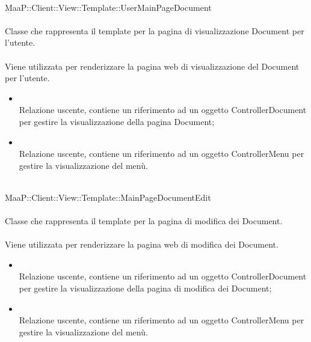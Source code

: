 	\\
	MaaP::Client::View::Template::UserMainPageDocument\\
	\\
	Classe che rappresenta il template per la pagina di visualizzazione Document per l'utente.\\
	\\
	Viene utilizzata per renderizzare la pagina web di visualizzazione del Document per l'utente.\\
	\begin{itemize}
	\item{}\\
	Relazione uscente, contiene un riferimento ad un oggetto ControllerDocument per gestire la visualizzazione della pagina Document;
	\item{}\\
	Relazione uscente, contiene un riferimento ad un oggetto ControllerMenu per gestire la visualizzazione del menù.
	\end{itemize}
	
	\\
	MaaP::Client::View::Template::MainPageDocumentEdit\\
	\\
	Classe che rappresenta il template per la pagina di modifica dei Document.\\
	\\
	Viene utilizzata per renderizzare la pagina web di modifica dei Document.\\
	\begin{itemize}
	\item{}\\
	Relazione uscente, contiene un riferimento ad un oggetto ControllerDocument per gestire la visualizzazione della pagina di modifica dei Document;
	\item{}\\
	Relazione uscente, contiene un riferimento ad un oggetto ControllerMenu per gestire la visualizzazione del menù.
	\end{itemize}

